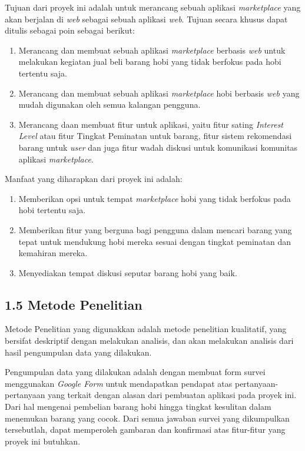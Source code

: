 \documentclass[a4paper]{article}
\begin{document}
Tujuan dari proyek ini adalah untuk merancang sebuah aplikasi \textit{marketplace} yang akan berjalan di \textit{web} sebagai sebuah aplikasi \textit{web}. Tujuan secara khusus dapat ditulis sebagai poin sebagai berikut:
\begin{enumerate}
    \item Merancang dan membuat sebuah aplikasi \textit{marketplace} berbasis \textit{web} untuk melakukan kegiatan jual beli barang hobi yang tidak berfokus pada hobi tertentu saja.
    \item Merancang dan membuat sebuah aplikasi \textit{marketplace} hobi berbasis \textit{web} yang mudah digunakan oleh semua kalangan pengguna.
    \item Merancang daan membuat fitur untuk aplikasi, yaitu fitur sating \textit{Interest Level} atau fitur Tingkat Peminatan untuk barang, fitur sistem rekomendasi barang untuk \textit{user} dan juga fitur wadah diskusi untuk komunikasi komunitas aplikasi \textit{marketplace}.
\end{enumerate}

Manfaat yang diharapkan dari proyek ini adalah:
\begin{enumerate}
    \item Memberikan opsi untuk tempat \textit{marketplace} hobi yang tidak berfokus pada hobi tertentu saja.
    \item Memberikan fitur yang berguna bagi pengguna dalam mencari barang yang tepat untuk mendukung hobi mereka sesuai dengan tingkat peminatan dan kemahiran mereka.
    \item Menyediakan tempat diskusi seputar barang hobi yang baik.
\end{enumerate}

\subsection*{1.5 Metode Penelitian}

Metode Penelitian yang digunakkan adalah metode penelitian kualitatif, yang bersifat deskriptif dengan melakukan analisis\autocite{pengajar-kualitatif}, dan akan melakukan analisis dari hasil pengumpulan data yang dilakukan.


Pengumpulan data yang dilakukan adalah dengan membuat form survei menggunakan \textit{Google Form} untuk mendapatkan pendapat atas pertanyaan-pertanyaan yang terkait dengan alasan dari pembuatan aplikasi pada proyek ini. Dari hal mengenai pembelian barang hobi hingga tingkat kesulitan dalam menemukan barang yang cocok. Dari semua jawaban survei yang dikumpulkan tersebutlah, dapat memperoleh gambaran dan konfirmasi atas fitur-fitur yang proyek ini butuhkan.
\end{document}
